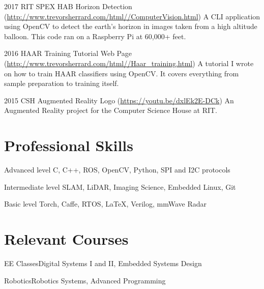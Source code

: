 \documentclass{tccv}
\begin{document}
\begin{yearlist}

\item{2017}
     {RIT SPEX HAB Horizon Detection (\href{http://www.trevorsherrard.com/html/ComputerVision.html}{http://www.trevorsherrard.com/html/\newline/ComputerVision.html})}
     {A CLI application using OpenCV to detect the earth's horizon in images taken from a high altitude balloon. This code ran on a Raspberry Pi at 60,000+ feet.}

\item{2016}
     {HAAR Training Tutorial Web Page (\href{http://www.trevorsherrard.com/html/Haar_training.html}{http://www.trevorsherrard.com/html/\newline/Haar\_training.html})}
     {A tutorial I wrote on how to train HAAR classifiers using OpenCV. It covers everything from sample preparation to training itself.}
     
\item{2015}
     {CSH Augmented Reality Logo (\href{https://youtu.be/dxlEk2E-DCk}{https://youtu.be/dxlEk2E-DCk})}
     {An Augmented Reality project for the Computer Science House at RIT.}

\end{yearlist}


\section{Professional Skills}
\begin{factlist}

\item{Advanced  level}
     {C, C++, ROS, OpenCV, Python, SPI and I2C protocols}

\item{Intermediate level}
     {SLAM, LiDAR, Imaging Science, Embedded Linux, Git}

\item{Basic level}
     {Torch, Caffe, RTOS, \LaTeX, Verilog, mmWave Radar}

\end{factlist}

\section{Relevant Courses}
\begin{factlist}

\item{EE Classes}{Digital Systems I and II, Embedded Systems Design}

\item{Robotics}{Robotics Systems, Advanced Programming}

\end{factlist}
\end{document}
